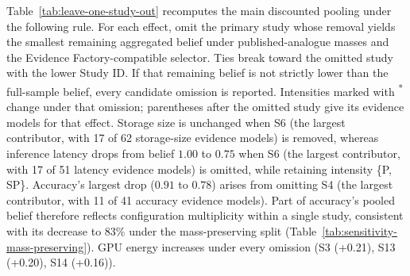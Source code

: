 Table~\ref{tab:leave-one-study-out} recomputes the main discounted pooling under the following rule. For each effect, omit the primary study whose removal yields the smallest remaining aggregated belief under published-analogue masses and the Evidence Factory-compatible selector. Ties break toward the omitted study with the lower Study ID. If that remaining belief is not strictly lower than the full-sample belief, every candidate omission is reported. Intensities marked with \textsuperscript{*} change under that omission; parentheses after the omitted study give its evidence models for that effect. Storage size is unchanged when S6 (the largest contributor, with 17 of 62 storage-size evidence models) is removed, whereas inference latency drops from belief $1.00$ to $0.75$ when S6 (the largest contributor, with 17 of 51 latency evidence models) is omitted, while retaining intensity \{P, SP\}. Accuracy's largest drop ($0.91$ to $0.78$) arises from omitting S4 (the largest contributor, with 11 of 41 accuracy evidence models). Part of accuracy's pooled belief therefore reflects configuration multiplicity within a single study, consistent with its decrease to 83\% under the mass-preserving split (Table~\ref{tab:sensitivity-mass-preserving}). GPU energy increases under every omission (S3 (+0.21), S13 (+0.20), S14 (+0.16)).
